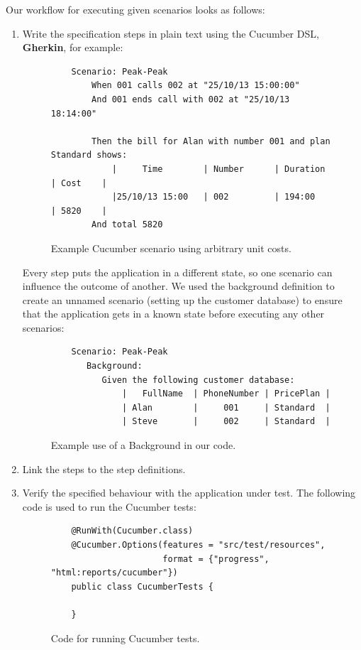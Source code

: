 \documentclass[a4paper]{article}
\begin{document}
Our workflow for executing given scenarios looks as follows:
\begin{enumerate}
\item Write the specification steps in plain text using the Cucumber DSL, {\bf Gherkin}, for example:

\begin{figure}[H]
\begin{verbatim}
    Scenario: Peak-Peak
        When 001 calls 002 at "25/10/13 15:00:00"
        And 001 ends call with 002 at "25/10/13 18:14:00"

        Then the bill for Alan with number 001 and plan Standard shows:
            |     Time        | Number      | Duration  | Cost    |
            |25/10/13 15:00   | 002         | 194:00    | 5820    |
        And total 5820

\end{verbatim}
\caption{Example Cucumber scenario using arbitrary unit costs.}
\end{figure}

Every step puts the application in a different state, so one scenario can influence the outcome of another. We used the background definition to create an unnamed scenario (setting up the customer database) to ensure that the application gets in a known state before executing any other scenarios:

\begin{figure}[H]
\begin{verbatim}
    Scenario: Peak-Peak
       Background:
          Given the following customer database:
              |   FullName  | PhoneNumber | PricePlan |
              | Alan        |     001     | Standard  |
              | Steve       |     002     | Standard  |

\end{verbatim}
\caption{Example use of a Background in our code.}
\end{figure}

\item Link the steps to the step definitions.
\item Verify the specified behaviour with the application under test.
The following code is used to run the Cucumber tests:

\begin{figure}[H]
\begin{verbatim}
    @RunWith(Cucumber.class)
    @Cucumber.Options(features = "src/test/resources",
                      format = {"progress", "html:reports/cucumber"})
    public class CucumberTests {
    
    }
\end{verbatim}
\caption{Code for running Cucumber tests.}
\end{figure}

\end{enumerate}
\end{document}

